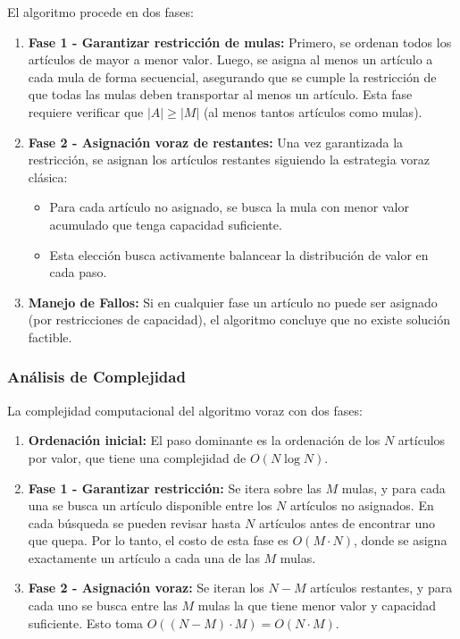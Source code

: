 \documentclass[12pt, a4paper]{article}
\begin{document}
    El algoritmo procede en dos fases:
    \begin{enumerate}
        \item \textbf{Fase 1 - Garantizar restricción de mulas:} Primero, se ordenan todos los artículos de mayor a menor valor. Luego, se asigna al menos un artículo a cada mula de forma secuencial, asegurando que se cumple la restricción de que todas las mulas deben transportar al menos un artículo. Esta fase requiere verificar que $|A| \geq |M|$ (al menos tantos artículos como mulas).

        \item \textbf{Fase 2 - Asignación voraz de restantes:} Una vez garantizada la restricción, se asignan los artículos restantes siguiendo la estrategia voraz clásica:
        \begin{itemize}
            \item Para cada artículo no asignado, se busca la mula con menor valor acumulado que tenga capacidad suficiente.
            \item Esta elección busca activamente balancear la distribución de valor en cada paso.
        \end{itemize}

        \item \textbf{Manejo de Fallos:} Si en cualquier fase un artículo no puede ser asignado (por restricciones de capacidad), el algoritmo concluye que no existe solución factible.
    \end{enumerate}

    \subsubsection{Análisis de Complejidad}
    La complejidad computacional del algoritmo voraz con dos fases:
    \begin{enumerate}
        \item \textbf{Ordenación inicial:} El paso dominante es la ordenación de los $N$ artículos por valor, que tiene una complejidad de $O(N \log N)$.
        \item \textbf{Fase 1 - Garantizar restricción:} Se itera sobre las $M$ mulas, y para cada una se busca un artículo disponible entre los $N$ artículos no asignados. En cada búsqueda se pueden revisar hasta $N$ artículos antes de encontrar uno que quepa. Por lo tanto, el costo de esta fase es $O(M \cdot N)$, donde se asigna exactamente un artículo a cada una de las $M$ mulas.
        \item \textbf{Fase 2 - Asignación voraz:} Se iteran los $N - M$ artículos restantes, y para cada uno se busca entre las $M$ mulas la que tiene menor valor y capacidad suficiente. Esto toma $O((N-M) \cdot M) = O(N \cdot M)$.
    \end{enumerate}
\end{document}
